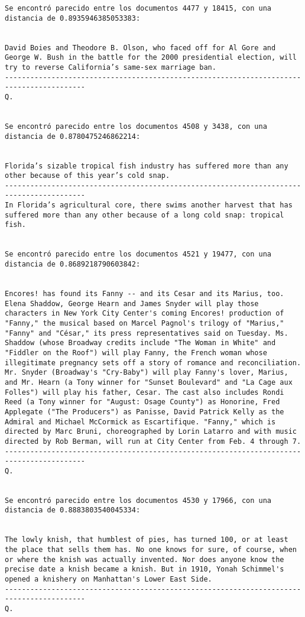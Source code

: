 \documentclass[11pt]{article}
\begin{document}
\begin{Verbatim}[commandchars=\\\{\}]
Se encontró parecido entre los documentos 4477 y 18415, con una distancia de 0.8935946385053383:


David Boies and Theodore B. Olson, who faced off for Al Gore and George W. Bush in the battle for the 2000 presidential election, will try to reverse California’s same-sex marriage ban.
-----------------------------------------------------------------------------------------
Q.


Se encontró parecido entre los documentos 4508 y 3438, con una distancia de 0.8780475246862214:


Florida’s sizable tropical fish industry has suffered more than any other because of this year’s cold snap.
-----------------------------------------------------------------------------------------
In Florida’s agricultural core, there swims another harvest that has suffered more than any other because of a long cold snap: tropical fish.


Se encontró parecido entre los documentos 4521 y 19477, con una distancia de 0.8689218790603842:


Encores! has found its Fanny -- and its Cesar and its Marius, too. Elena Shaddow, George Hearn and James Snyder will play those characters in New York City Center's coming Encores! production of "Fanny," the musical based on Marcel Pagnol's trilogy of "Marius," "Fanny" and "César," its press representatives said on Tuesday. Ms. Shaddow (whose Broadway credits include "The Woman in White" and "Fiddler on the Roof") will play Fanny, the French woman whose illegitimate pregnancy sets off a story of romance and reconciliation. Mr. Snyder (Broadway's "Cry-Baby") will play Fanny's lover, Marius, and Mr. Hearn (a Tony winner for "Sunset Boulevard" and "La Cage aux Folles") will play his father, Cesar. The cast also includes Rondi Reed (a Tony winner for "August: Osage County") as Honorine, Fred Applegate ("The Producers") as Panisse, David Patrick Kelly as the Admiral and Michael McCormick as Escartifique. "Fanny," which is directed by Marc Bruni, choreographed by Lorin Latarro and with music directed by Rob Berman, will run at City Center from Feb. 4 through 7.
-----------------------------------------------------------------------------------------
Q.


Se encontró parecido entre los documentos 4530 y 17966, con una distancia de 0.8883803540045334:


The lowly knish, that humblest of pies, has turned 100, or at least the place that sells them has. No one knows for sure, of course, when or where the knish was actually invented. Nor does anyone know the precise date a knish became a knish. But in 1910, Yonah Schimmel's opened a knishery on Manhattan's Lower East Side.
-----------------------------------------------------------------------------------------
Q.



\end{Verbatim}
\end{document}
